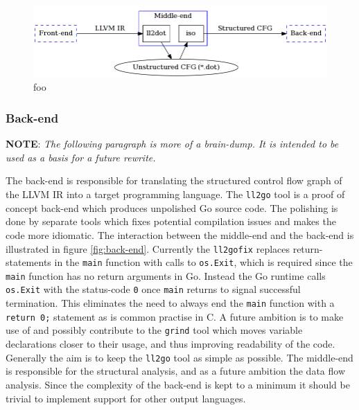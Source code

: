 \begin{figure}[htbp]
	\begin{center}
		\includegraphics[width=\textwidth]{inc/middle-end.png}
		\caption{foo}
		\label{fig:middle-end}
	\end{center}
\end{figure}

\subsubsection{Back-end}




\textbf{NOTE}: \textit{The following paragraph is more of a brain-dump. It is intended to be used as a basis for a future rewrite.}

The back-end is responsible for translating the structured control flow graph of the LLVM IR into a target programming language. The \texttt{ll2go} tool is a proof of concept back-end which produces unpolished Go source code. The polishing is done by separate tools which fixes potential compilation issues and makes the code more idiomatic. The interaction between the middle-end and the back-end is illustrated in figure \ref{fig:back-end}. Currently the \texttt{ll2gofix} replaces return-statements in the \texttt{main} function with calls to \texttt{os.Exit}, which is required since the \texttt{main} function has no return arguments in Go. Instead the Go runtime calls \texttt{os.Exit} with the status-code \texttt{0} once \texttt{main} returns to signal successful termination. This eliminates the need to always end the \texttt{main} function with a \texttt{return 0;} statement as is common practise in C. A future ambition is to make use of and possibly contribute to the \texttt{grind} tool which moves variable declarations closer to their usage, and thus improving readability of the code. Generally the aim is to keep the \texttt{ll2go} tool as simple as possible. The middle-end is responsible for the structural analysis, and as a future ambition the data flow analysis. Since the complexity of the back-end is kept to a minimum it should be trivial to implement support for other output languages.

